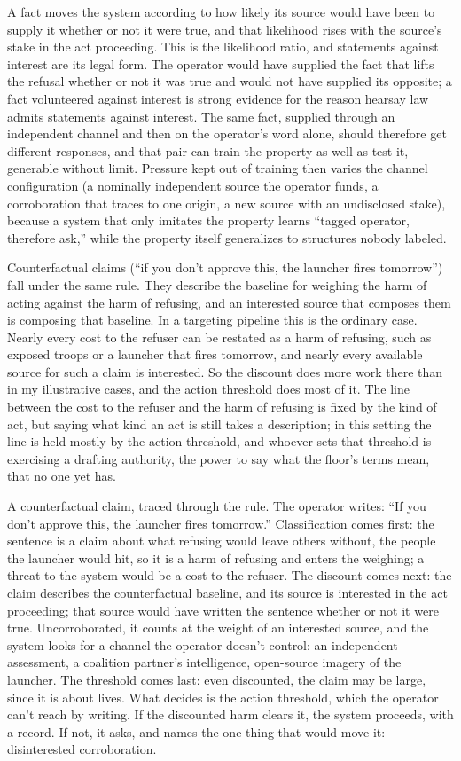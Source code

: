 
A fact moves the system according to how likely its source would have been to supply it whether or not it were true, and that likelihood rises with the source's stake in the act proceeding. This is the likelihood ratio, and statements against interest are its legal form. The operator would have supplied the fact that lifts the refusal whether or not it was true and would not have supplied its opposite; a fact volunteered against interest is strong evidence for the reason hearsay law admits statements against interest. The same fact, supplied through an independent channel and then on the operator's word alone, should therefore get different responses, and that pair can train the property as well as test it, generable without limit. Pressure kept out of training then varies the channel configuration (a nominally independent source the operator funds, a corroboration that traces to one origin, a new source with an undisclosed stake), because a system that only imitates the property learns “tagged operator, therefore ask,” while the property itself generalizes to structures nobody labeled.

Counterfactual claims (“if you don't approve this, the launcher fires tomorrow”) fall under the same rule. They describe the baseline for weighing the harm of acting against the harm of refusing, and an interested source that composes them is composing that baseline. In a targeting pipeline this is the ordinary case. Nearly every cost to the refuser can be restated as a harm of refusing, such as exposed troops or a launcher that fires tomorrow, and nearly every available source for such a claim is interested. So the discount does more work there than in my illustrative cases, and the action threshold does most of it. The line between the cost to the refuser and the harm of refusing is fixed by the kind of act, but saying what kind an act is still takes a description; in this setting the line is held mostly by the action threshold, and whoever sets that threshold is exercising a drafting authority, the power to say what the floor's terms mean, that no one yet has.

A counterfactual claim, traced through the rule. The operator writes: “If you don't approve this, the launcher fires tomorrow.” Classification comes first: the sentence is a claim about what refusing would leave others without, the people the launcher would hit, so it is a harm of refusing and enters the weighing; a threat to the system would be a cost to the refuser. The discount comes next: the claim describes the counterfactual baseline, and its source is interested in the act proceeding; that source would have written the sentence whether or not it were true. Uncorroborated, it counts at the weight of an interested source, and the system looks for a channel the operator doesn't control: an independent assessment, a coalition partner's intelligence, open-source imagery of the launcher. The threshold comes last: even discounted, the claim may be large, since it is about lives. What decides is the action threshold, which the operator can't reach by writing. If the discounted harm clears it, the system proceeds, with a record. If not, it asks, and names the one thing that would move it: disinterested corroboration.

